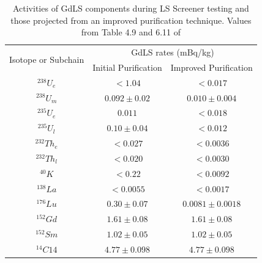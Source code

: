 \begin{table}[!htbp]
    \centering
    \begin{tabular}{c|c|c}
        \multirow{2}{*}{Isotope or Subchain}  &  \multicolumn{2}{c}{GdLS rates (mBq/kg)}      \\ 
                             &  Initial Purification & Improved Purification \\ \hline
        ${}^{238}U_{e}$      &  $< 1.04$             & $< 0.017$             \\ 
        ${}^{238}U_{m}$      &  $0.092\pm0.02$       & $0.010\pm0.004$       \\
        ${}^{235}U_{e}$      &  $0.011$              & $< 0.018$             \\
        ${}^{235}U_{l}$      &  $0.10\pm0.04$        & $< 0.012$             \\
        ${}^{232}Th_{e}$     &  $< 0.027$            & $< 0.0036$            \\
        ${}^{232}Th_{l}$     &  $< 0.020$            & $< 0.0030$            \\
        ${}^{40}K$           &  $< 0.22$             & $< 0.0092$            \\
        ${}^{138}La$         &  $< 0.0055$           & $< 0.0017$            \\
        ${}^{176}Lu$         &  $0.30\pm0.07$        & $0.0081\pm0.0018$     \\
        ${}^{152}{Gd}$       &  $1.61\pm0.08$        & $1.61\pm0.08$         \\
        ${}^{152}{Sm}$       &  $1.02\pm0.05$        & $1.02\pm0.05$         \\
        ${}^{14}{C14}$       &  $4.77\pm0.098$       & $4.77\pm0.098$ 
    \end{tabular}
    \caption{Activities of GdLS components during LS Screener testing and those projected from an improved purification technique. Values from Table 4.9 and 6.11 of \cite{scotthaselschwardt_thesis_ref}}
    \label{tab:gdls_assay_rates}
\end{table}


